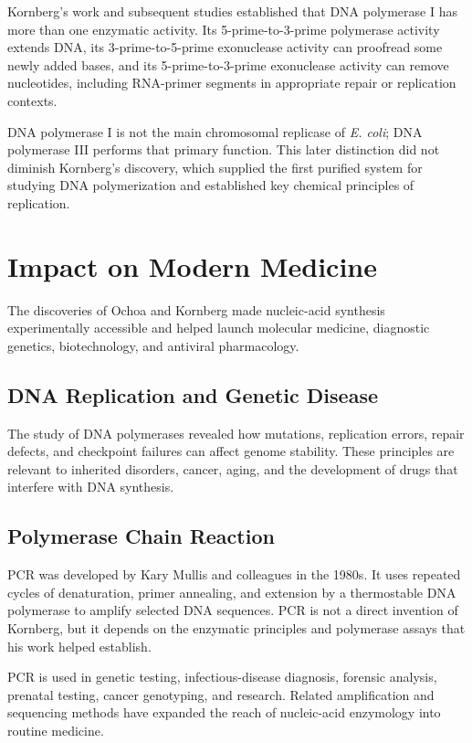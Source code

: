 Kornberg's work and subsequent studies established that DNA polymerase I has more than one enzymatic activity. Its 5-prime-to-3-prime polymerase activity extends DNA, its 3-prime-to-5-prime exonuclease activity can proofread some newly added bases, and its 5-prime-to-3-prime exonuclease activity can remove nucleotides, including RNA-primer segments in appropriate repair or replication contexts.

DNA polymerase I is not the main chromosomal replicase of \textit{E. coli}; DNA polymerase III performs that primary function. This later distinction did not diminish Kornberg's discovery, which supplied the first purified system for studying DNA polymerization and established key chemical principles of replication.

\section{Impact on Modern Medicine}

The discoveries of Ochoa and Kornberg made nucleic-acid synthesis experimentally accessible and helped launch molecular medicine, diagnostic genetics, biotechnology, and antiviral pharmacology.

\subsection{DNA Replication and Genetic Disease}

The study of DNA polymerases revealed how mutations, replication errors, repair defects, and checkpoint failures can affect genome stability. These principles are relevant to inherited disorders, cancer, aging, and the development of drugs that interfere with DNA synthesis.

\subsection{Polymerase Chain Reaction}

PCR was developed by Kary Mullis and colleagues in the 1980s. It uses repeated cycles of denaturation, primer annealing, and extension by a thermostable DNA polymerase to amplify selected DNA sequences. PCR is not a direct invention of Kornberg, but it depends on the enzymatic principles and polymerase assays that his work helped establish.

PCR is used in genetic testing, infectious-disease diagnosis, forensic analysis, prenatal testing, cancer genotyping, and research. Related amplification and sequencing methods have expanded the reach of nucleic-acid enzymology into routine medicine.


